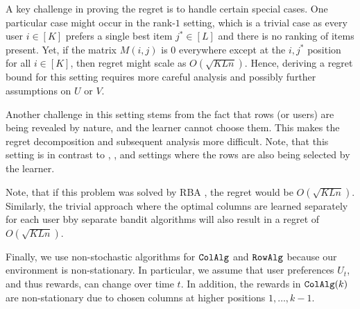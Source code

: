 A key challenge in proving the regret is to handle certain special cases. One particular case might occur in the rank-$1$ setting, which is a trivial case as every user $i \in [K]$ prefers a single best item $j^\ast \in [L]$ and there is no ranking of items present. Yet, if the matrix $M(i,j)$ is $0$ everywhere except at the $i,j^\ast$ position for all $i\in [K]$, then regret might scale as $O(\sqrt{KLn})$. Hence, deriving a regret bound for this setting requires more careful analysis and possibly further assumptions on $U$ or $V$.

Another challenge in this setting stems from the fact that rows (or users) are being revealed by nature, and the learner cannot choose them. This makes the regret decomposition and subsequent analysis more difficult. Note, that this setting is in contrast to \citet{katariya2017bernoulli}, \citet{katariya2016stochastic}, and  \citet{kveton2017stochastic} settings where the rows are also being selected by the learner.


Note, that if this problem was solved by RBA \citep{radlinski2008learning}, the regret would be $O(\sqrt{K L n})$. Similarly, the trivial approach where the optimal columns are learned separately for each user bby separate bandit algorithms will also result in a regret of $O(\sqrt{K L n})$.

Finally, we use non-stochastic algorithms for ${\tt ColAlg}$ and ${\tt RowAlg}$ because our environment is non-stationary. In particular, we assume that user preferences $U_t$, and thus rewards, can change over time $t$. In addition, the rewards in ${\tt ColAlg}(k)$ are non-stationary due to chosen columns at higher positions $1, \dots, k - 1$.
